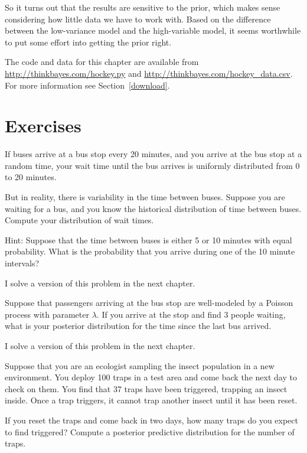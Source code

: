 \documentclass[12pt]{book}
\begin{document}
So it turns out that the results are sensitive to the prior, which
makes sense considering how little data we have to work with.  Based
on the difference between the low-variance model and the high-variable
model, it seems worthwhile to put some effort into getting the prior
right.

The code and data for this chapter are available from
\url{http://thinkbayes.com/hockey.py} and
\url{http://thinkbayes.com/hockey_data.csv}.
  For more information
see Section~\ref{download}.

\section{Exercises}

\begin{exercise}

If buses arrive at a bus stop every 20 minutes, and you
arrive at the bus stop at a random time, your wait time until
the bus arrives is uniformly distributed from 0 to 20 minutes.

But in reality, there is variability in the time between
buses.  Suppose you are waiting for a bus, and you know the historical
distribution of time between buses.  Compute your distribution
of wait times.

Hint: Suppose that the time between buses is either
5 or 10 minutes with equal probability.  What is the probability
that you arrive during one of the 10 minute intervals?

I solve a version of this problem in the next chapter.

\end{exercise}


\begin{exercise}

Suppose that passengers arriving at the bus stop are well-modeled
by a Poisson process with parameter $\lambda$.  If you arrive at the
stop and find 3 people waiting, what is your posterior distribution
for the time since the last bus arrived.

I solve a version of this problem in the next chapter.

\end{exercise}


\begin{exercise}

Suppose that you are an ecologist sampling the insect population in
a new environment.  You deploy 100 traps in a test area and come back
the next day to check on them.  You find that 37 traps have been
triggered, trapping an insect inside.  Once a trap triggers, it
cannot trap another insect until it has been reset.

If you reset the traps and come back in two days, how many traps
do you expect to find triggered?  Compute a posterior predictive
distribution for the number of traps.

\end{exercise}
\end{document}
